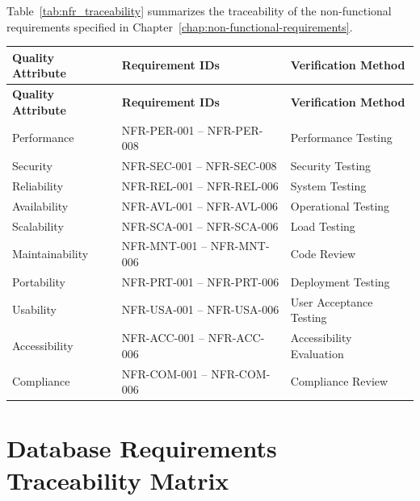 Table~\ref{tab:nfr_traceability} summarizes the traceability of the
non-functional requirements specified in Chapter~\ref{chap:non-functional-requirements}.

\begin{longtable}{|p{5cm}|p{4cm}|p{4cm}|}

\hline
\textbf{Quality Attribute} &
\textbf{Requirement IDs} &
\textbf{Verification Method} \\
\hline
\endfirsthead

\hline
\textbf{Quality Attribute} &
\textbf{Requirement IDs} &
\textbf{Verification Method} \\
\hline
\endhead

Performance &
NFR-PER-001 -- NFR-PER-008 &
Performance Testing \\
\hline

Security &
NFR-SEC-001 -- NFR-SEC-008 &
Security Testing \\
\hline

Reliability &
NFR-REL-001 -- NFR-REL-006 &
System Testing \\
\hline

Availability &
NFR-AVL-001 -- NFR-AVL-006 &
Operational Testing \\
\hline

Scalability &
NFR-SCA-001 -- NFR-SCA-006 &
Load Testing \\
\hline

Maintainability &
NFR-MNT-001 -- NFR-MNT-006 &
Code Review \\
\hline

Portability &
NFR-PRT-001 -- NFR-PRT-006 &
Deployment Testing \\
\hline

Usability &
NFR-USA-001 -- NFR-USA-006 &
User Acceptance Testing \\
\hline

Accessibility &
NFR-ACC-001 -- NFR-ACC-006 &
Accessibility Evaluation \\
\hline

Compliance &
NFR-COM-001 -- NFR-COM-006 &
Compliance Review \\
\hline

\end{longtable}

\section{Database Requirements Traceability Matrix}

